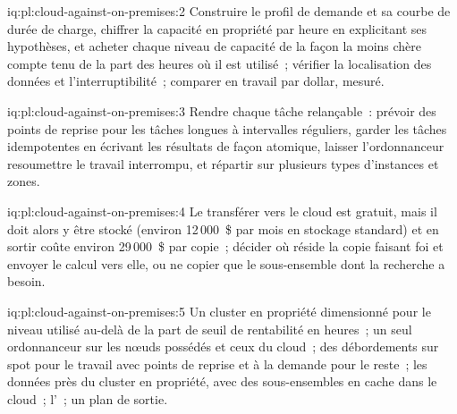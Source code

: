 \begin{solution}{iq:pl:cloud-against-on-premises:2}
Construire le profil de demande et sa courbe de durée de charge, chiffrer la capacité en propriété par heure en explicitant ses hypothèses, et acheter chaque niveau de capacité
de la façon la moins chère compte tenu de la part des heures où il est utilisé~; vérifier la localisation des données et l'interruptibilité~; comparer en travail par dollar, mesuré.
\end{solution}

\begin{solution}{iq:pl:cloud-against-on-premises:3}
Rendre chaque tâche relançable~: prévoir des points de reprise pour les tâches longues à intervalles réguliers, garder les tâches idempotentes en écrivant les résultats de façon atomique, laisser
l'ordonnanceur resoumettre le travail interrompu, et répartir sur plusieurs types d'instances et zones.
\end{solution}

\begin{solution}{iq:pl:cloud-against-on-premises:4}
Le transférer vers le cloud est gratuit, mais il doit alors y être stocké (environ 12\,000~\$ par mois en stockage standard) et en sortir coûte environ 29\,000~\$ par
copie~; décider où réside la copie faisant foi et envoyer le calcul vers elle, ou ne copier que le sous-ensemble dont la recherche a besoin.
\end{solution}

\begin{solution}{iq:pl:cloud-against-on-premises:5}
Un cluster en propriété dimensionné pour le niveau utilisé au-delà de la part de seuil de rentabilité en heures~; un seul ordonnanceur sur les nœuds possédés et ceux du cloud~; des débordements sur spot pour
le travail avec points de reprise et à la demande pour le reste~; les données près du cluster en propriété, avec des sous-ensembles en cache dans le cloud~; l'~; un plan de sortie.
\end{solution}
